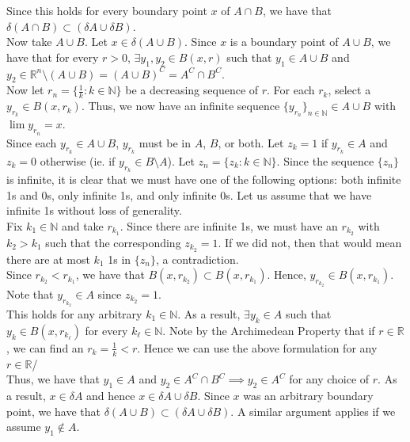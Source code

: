 \documentclass[12pt]{article}
\begin{document}
Since this holds for every boundary point $x$ of $A \cap B$, we have that $\delta(A \cap B) \subset (\delta A \cup \delta B)$.\\

Now take $A \cup B$. Let $x \in \delta(A \cup B)$. Since $x$ is a boundary point of $A \cup B$, we have that for every $r > 0$, $\exists y_1, y_2 \in B(x, r)$ such that $y_1 \in A \cup B$ and $y_2 \in \mathbb{R}^n \setminus (A \cup B) = (A \cup B)^C = A^C \cap B^C$.\\

Now let $r_n = \{\frac{1}{k}: k \in \mathbb{N}\}$ be a decreasing sequence of $r$. For each $r_k$, select a $y_{r_k} \in B(x, r_k)$. Thus, we now have an infinite sequence $\{y_{r_n}\}_{n \in \mathbb{N}} \in A \cup B$ with $\lim y_{r_n} = x$.\\

Since each $y_{r_k} \in A \cup B$, $y_{r_k}$ must be in $A$, $B$, or both. Let $z_k = 1$ if $y_{r_k} \in A$ and $z_k = 0$ otherwise (ie. if $y_{r_k} \in B \setminus A$). Let $z_n = \{z_k: k \in \mathbb{N}\}$. Since the sequence $\{z_n\}$ is infinite, it is clear that we must have one of the following options: both infinite 1s and 0s, only infinite 1s, and only infinite 0s. Let us assume that we have infinite 1s without loss of generality.\\

Fix $k_1 \in \mathbb{N}$ and take $r_{k_1}$. Since there are infinite 1s, we must have an $r_{k_2}$ with $k_2 > k_1$ such that the corresponding $z_{k_2} = 1$. If we did not, then that would mean there are at most $k_1$ 1s in $\{z_n\}$, a contradiction.\\

Since $r_{k_2} < r_{k_1}$, we have that $B(x, r_{k_2}) \subset B(x, r_{k_1})$. Hence, $y_{r_{k_2}} \in B(x, r_{k_1})$. Note that $y_{r_{k_2}} \in A$ since $z_{k_2} = 1$.\\

This holds for any arbitrary $k_1 \in \mathbb{N}$. As a result, $\exists y_k \in A$ such that $y_k \in B(x, r_{k_{\ell}})$ for every $k_{\ell} \in \mathbb{N}$. Note by the Archimedean Property that if $r \in \mathbb{R}$, we can find an $r_k = \frac{1}{k} < r$. Hence we can use the above formulation for any $r \in \mathbb{R}$/\\

Thus, we have that $y_1 \in A$ and $y_2 \in A^C \cap B^C \implies y_2 \in A^C$ for any choice of $r$. As a result, $x \in \delta A$ and hence $x \in \delta A \cup \delta B$. Since $x$ was an arbitrary boundary point, we have that $\delta(A \cup B) \subset (\delta A \cup \delta B)$. A similar argument applies if we assume $y_1 \not\in A$.\\
\end{document}
